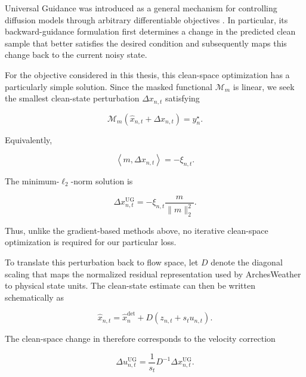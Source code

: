 Universal Guidance was introduced as a general mechanism for controlling
diffusion models through arbitrary differentiable objectives
\parencite{bansal2023universal}. In particular, its backward-guidance
formulation first determines a change in the predicted clean sample that better
satisfies the desired condition and subsequently maps this change back to the
current noisy state.

For the objective considered in this thesis, this clean-space optimization has
a particularly simple solution. Since the masked functional
\(\mathcal{M}_m\) is linear, we seek the smallest clean-state perturbation
\(\Delta x_{n,t}\) satisfying

\begin{equation}
    \mathcal{M}_m
    \left(
        \hat{x}_{n,t}+\Delta x_{n,t}
    \right)
    =
    y_n^\star.
\end{equation}

Equivalently,

\begin{equation}
    \left\langle
        m,\Delta x_{n,t}
    \right\rangle
    =
    -\xi_{n,t}.
\end{equation}

The minimum-\(\ell_2\)-norm solution is

\begin{equation}
    \Delta x_{n,t}^{\mathrm{UG}}
    =
    -\xi_{n,t}
    \frac{m}{\lVert m\rVert_2^2}.
    \label{eq:ug-clean-shift}
\end{equation}

Thus, unlike the gradient-based methods above, no iterative clean-space
optimization is required for our particular loss.

To translate this perturbation back to flow space, let \(D\) denote the
diagonal scaling that maps the normalized residual representation used by
ArchesWeather to physical state units. The clean-state estimate can then be
written schematically as

\begin{equation}
    \hat{x}_{n,t}
    =
    \hat{x}^{\mathrm{det}}_n
    +
    D
    \left(
        z_{n,t}
        +
        s_tu_{n,t}
    \right).
    \label{eq:ug-clean-affine}
\end{equation}

The clean-space change in  therefore corresponds to the
velocity correction

\begin{equation}
    \Delta u_{n,t}^{\mathrm{UG}}
    =
    \frac{1}{s_t}
    D^{-1}
    \Delta x_{n,t}^{\mathrm{UG}}.
    \label{eq:ug-velocity-shift}
\end{equation}

